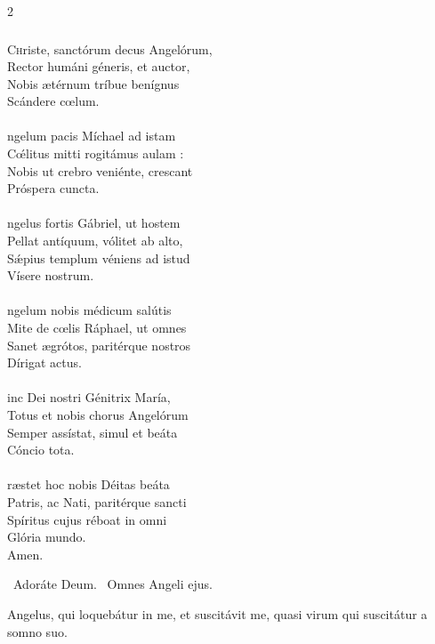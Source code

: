 \documentclass[9pt,twoside]{extarticle}
\begin{document}
\begin{multicols}{2}
{{\subsubsection*{\center {}}
\lettrine{C}hriste, sanctórum decus Angelórum,\\
Rector humáni géneris, et auctor,\\
Nobis ætérnum tríbue benígnus\\
Scándere cœlum.\\
\\
ngelum pacis Míchael ad istam\\
Cœ́litus mitti rogitámus aulam :\\
Nobis ut crebro veniénte, crescant\\
Próspera cuncta.\\
\\
ngelus fortis Gábriel, ut hostem\\
Pellat antíquum, vólitet ab alto,\\
Sǽpius templum véniens ad istud\\
Vísere nostrum.\\
\\
ngelum nobis médicum salútis\\
Mite de cœlis Ráphael, ut omnes\\
Sanet ægrótos, paritérque nostros\\
Dírigat actus.\\
\\
inc Dei nostri Génitrix María,\\
Totus et nobis chorus Angelórum\\
Semper assístat, simul et beáta\\
Cóncio tota.\\
\\
ræstet hoc nobis Déitas beáta\\
Patris, ac Nati, paritérque sancti\\
Spíritus cujus réboat in omni\\
Glória mundo.\\
Amen.

\begin{tightlist}{}
\item {}~Adoráte Deum. ~Omnes Angeli ejus.
\item {} Angelus, qui loquebátur in me, et suscitávit me, quasi virum qui suscitátur a somno suo.
\end{tightlist}

}}
\end{multicols}
\end{document}
